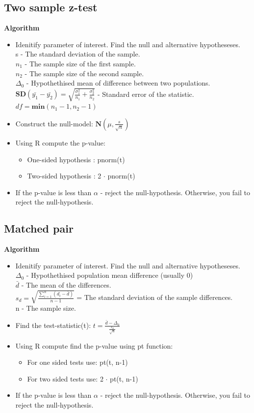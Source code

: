 \documentclass{article}
\begin{document}
\subsection{Two sample z-test}
\textbf{Algorithm}
\begin{itemize}
\item Idenitify parameter of interest. Find the null and alternative hypotheseses.\\
      s - The standard deviation of the sample.\\
      $n_1$ - The sample size of the first sample.\\
      $n_2$ - The sample size of the second sample.\\
      $\Delta_0$ - Hypothethised mean of difference between two populations.\\
      $\mathbf{SD}(\bar{y_1}-\bar{y_2}) = \sqrt{\frac{\sigma_1^2}{n_1}+\frac{\sigma_2^2}{n_2}}$ - Standard error of the statistic.\\
      $df = \mathbf{min}(n_1 - 1, n_2 -1)$
\item Construct the null-model: $\mathbf{N}(\mu,\frac{s}{\sqrt{n}})$
\item Using R compute the p-value:
\begin{itemize}
    \item One-sided hypothesis : pnorm(t)
    \item Two-sided hypothesis : 2 $\cdot$ pnorm(t)
\end{itemize}
\item If the p-value is less than $\alpha$ - reject the null-hypothesis. 
    Otherwise, you fail to reject the null-hypothesis.
\end{itemize}
\subsection{Matched pair}
\textbf{Algorithm}
\begin{itemize}
\item Idenitify parameter of interest. Find the null and alternative hypotheseses.\\
    $\Delta_0$ - Hypothethised population mean difference (usually 0)\\
    $\bar{d}$ - The mean of the differences.\\
    $s_d = \sqrt{\frac{\sum_{i = 1}^{n}(d_i - \bar{d})}{n-1}}$ = The standard deviation of the sample differences.\\
    n - The sample size.
\item Find the test-statistic(t): $t = \frac{\bar{d}-\Delta_0}{\frac{s_d}{\sqrt{n}}}$
\item Using R compute find the p-value using pt function:
\begin{itemize}
    \item For one sided tests use: pt(t, n-1)
    \item For two sided tests use: 2 $\cdot$ pt(t, n-1)
\end{itemize}
\item If the p-value is less than $\alpha$ - reject the null-hypothesis. 
    Otherwise, you fail to reject the null-hypothesis.
\end{itemize}
\end{document}
